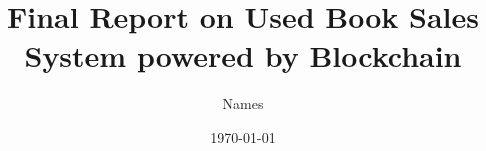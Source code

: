\documentclass{article}
\title{Final Report on Used Book Sales System powered by Blockchain}
\author{Names}
\date{\today}
\begin{document}
\maketitle

\begin{abstract}
    
\end{abstract}
\end{document}
